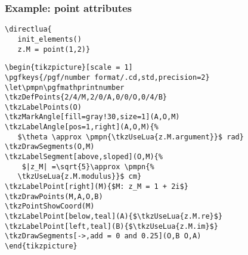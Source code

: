 \subsubsection{Example: point attributes} %
\label{ssub:example_point_attributes}

\hspace*{\fill}

\begin{verbatim}
\directlua{
   init_elements()
   z.M = point(1,2)}
\end{verbatim}
\let\pmpn\pgfmathprintnumber
\DeleteShortVerb{\|}

\begin{verbatim}
\begin{tikzpicture}[scale = 1]
\pgfkeys{/pgf/number format/.cd,std,precision=2}
\let\pmpn\pgfmathprintnumber
\tkzDefPoints{2/4/M,2/0/A,0/0/O,0/4/B}
\tkzLabelPoints(O)
\tkzMarkAngle[fill=gray!30,size=1](A,O,M)
\tkzLabelAngle[pos=1,right](A,O,M){%
   $\theta \approx \pmpn{\tkzUseLua{z.M.argument}}$ rad}
\tkzDrawSegments(O,M)
\tkzLabelSegment[above,sloped](O,M){%
    $|z_M| =\sqrt{5}\approx \pmpn{%
   \tkzUseLua{z.M.modulus}}$ cm}
\tkzLabelPoint[right](M){$M: z_M = 1 + 2i$}
\tkzDrawPoints(M,A,O,B)
\tkzPointShowCoord(M)
\tkzLabelPoint[below,teal](A){$\tkzUseLua{z.M.re}$}
\tkzLabelPoint[left,teal](B){$\tkzUseLua{z.M.im}$}
\tkzDrawSegments[->,add = 0 and 0.25](O,B O,A)
\end{tikzpicture}
\end{verbatim}


